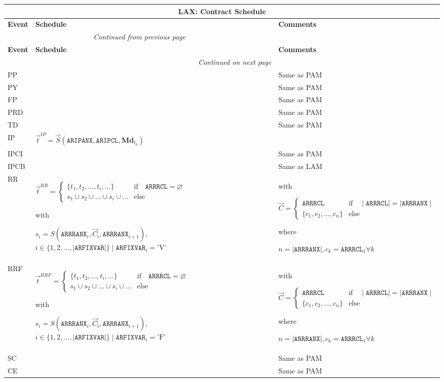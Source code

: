 \documentclass[9pt,oneside]{amsart}
\newenvironment{schedule}[1]{
	\hfill %
	\begin{longtable}{| p{0.05\textwidth} | p{0.5\textwidth} |  p{0.4\textwidth} |}
	\multicolumn{3}{c}{\textbf{#1: Contract Schedule}}\\
	\hline
	\textbf{Event} & \textbf{Schedule} & \textbf{Comments} \\
	\hline
	\endfirsthead
	\multicolumn{2}{c}{\textit{Continued from previous page}} \\
	\hline
	\textbf{Event} & \textbf{Schedule} & \textbf{Comments} \\
	\hline
	\endhead
	\hline \multicolumn{2}{r}{\textit{Continued on next page}} \\
	\endfoot
	\endlastfoot
}{%
	\hline
	\end{longtable}
}
\newcommand{\svar}[2]{\textbf{#1}_{#2}}
\newcommand{\attr}[1]{\texttt{#1}}
\newcommand{\sdl}[3]{S(#1,#2,#3)}
\newcommand{\vsdl}[3]{\vec{S}(#1,#2,#3)}
\newcommand{\undef}{\varnothing}
\begin{document}
\begin{schedule}{LAX}
	\hline
	PP & & Same as PAM \\
	\hline
	PY & & Same as PAM \\
	\hline
	FP & & Same as PAM \\
	\hline
	PRD & & Same as PAM \\
	\hline
	TD & & Same as PAM \\
	\hline
	IP & $\vec{t}^{IP} = \vsdl{\attr{ARIPANX}}{\attr{ARIPCL}}{\svar{Md}{t_0}}$ & \\
	\hline
	IPCI & & Same as PAM \\
  	\hline
	IPCB & & Same as LAM \\
	\hline
	RR & $\vec{t}^{RR} = \begin{cases} \{ t_1, t_2, ..., t_i, ... \} & \text{if}\quad \attr{ARRRCL}=\undef \\
					s_1 \cup s_2 \cup ... \cup s_i \cup ... & \text{else} \end{cases}$ \par
		with\par
		$s_i=\sdl{\attr{ARRRANX}_i}{\vec{C}_i}{\attr{ARRRANX}_{i+1}}$, $i\in\{1,2,...,\mid\attr{ARFIXVAR}\mid\} \mid \attr{ARFIXVAR}_i = \text{'V'}$
		& with\par $\vec{C} = \begin{cases} \attr{ARRRCL} & \text{if} \quad \mid\attr{ARRRCL}\mid = \mid \attr{ARRRANX}\mid \\
				   \{ c_1, c_2, ..., c_n \}  & \text{else} \end{cases}$ \par
			where\par
			$n=\mid\attr{ARRRANX}\mid, c_k=\attr{ARRRCL}_1\forall k$ \\
	\hline
	RRF & $\vec{t}^{RRF} = \begin{cases} \{ t_1, t_2, ..., t_i, ... \} & \text{if}\quad \attr{ARRRCL}=\undef \\
					s_1 \cup s_2 \cup ... \cup s_i \cup ... & \text{else} \end{cases}$ \par
		with\par
		$s_i=\sdl{\attr{ARRRANX}_i}{\vec{C}_i}{\attr{ARRRANX}_{i+1}}$, $i\in\{1,2,...,\mid\attr{ARFIXVAR}\mid\} \mid \attr{ARFIXVAR}_i = \text{'F'}$
		& with\par $\vec{C} = \begin{cases} \attr{ARRRCL} & \text{if} \quad \mid\attr{ARRRCL}\mid = \mid \attr{ARRRANX}\mid \\
				   \{ c_1, c_2, ..., c_n \}  & \text{else} \end{cases}$ \par
			where\par
			$n=\mid\attr{ARRRANX}\mid, c_k=\attr{ARRRCL}_1\forall k$ \\
	\hline
	SC & & Same as PAM \\
	\hline
	CE & & Same as PAM \\
\end{schedule}
\end{document}
